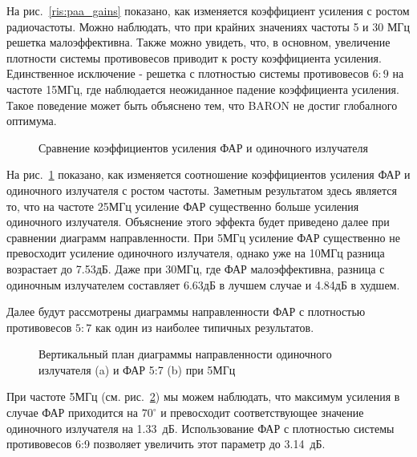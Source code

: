 На рис.~\ref{ris:paa_gains} показано, как изменяется коэффициент усиления с ростом радиочастоты. Можно наблюдать, что при крайних значениях частоты 5 и 30 МГц решетка малоэффективна. Также можно увидеть, что, в основном, увеличение плотности системы противовесов приводит к росту коэффициента усиления. Единственное исключение - решетка с плотностью системы противовесов $6:9$ на частоте 15МГц, где наблюдается неожиданное падение коэффициента усиления. Такое поведение может быть объяснено тем, что BARON не достиг глобалного оптимума.

\begin{figure}
\caption{Сравнение коэффициентов усиления ФАР и одиночного излучателя}
\label{ris:all_gains}
\end{figure}

На рис.~\ref{ris:all_gains} показано, как изменяется соотношение коэффициентов усиления ФАР и одиночного излучателя с ростом частоты. Заметным результатом здесь является то, что на частоте 25МГц усиление ФАР существенно больше усиления одиночного излучателя. Объяснение этого эффекта будет приведено далее при сравнении диаграмм направленности. При 5МГц усиление ФАР существенно не превосходит усиление одиночного излучателя, однако уже на 10МГц разница возрастает до 7.53дБ. Даже при 30МГц, где ФАР малоэффективна, разница с одиночным излучателем составляет 6.63дБ в лучшем случае и 4.84дБ в худшем.

Далее будут рассмотрены диаграммы направленности ФАР с плотностью противовесов $5:7$ как один из наиболее типичных результатов.

\begin{figure}
\begin{minipage}[h]{0.49\linewidth}
\end{minipage}
\hfill
\begin{minipage}[h]{0.49\linewidth}
\end{minipage}
\caption{Вертикальный план диаграммы направленности одиночного излучателя (a) и ФАР 5:7 (b) при 5МГц}
\label{ris:5MHz}
\end{figure}

При частоте 5МГц (см. рис.~\ref{ris:5MHz}) мы можем наблюдать, что максимум усиления в случае ФАР приходится на $70^{\circ}$ и превосходит соответствующее значение одиночного излучателя на 1.33~дБ. Использование ФАР с плотностью системы противовесов 6:9 позволяет увеличить этот параметр до 3.14~дБ.

